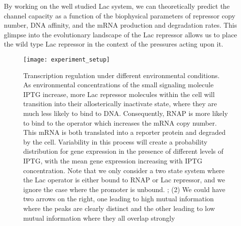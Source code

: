 By working on the well studied Lac system, we can theoretically predict the channel capacity as a function of the biophysical parameters of repressor copy number, DNA affinity, and the mRNA production and degradation rates. This glimpse into the evolutionary landscape of the Lac repressor allows us to place the wild type Lac repressor in the context of the pressures acting upon it.

\begin{figure}[h!]
	\centering \texttt{[image: experiment\_setup]} \caption{Transcription
		regulation under different environmental conditions. As environmental
		concentrations of the small signaling molecule IPTG increase, more Lac
		repressor molecules within the cell will transition into their allosterically
		inactivate state, where they are much less likely to bind to DNA. Consequently,
		RNAP is more likely to bind to the operator which increases the mRNA copy
		number. This mRNA is both translated into a reporter protein and degraded by
		the cell. Variability in this process will create a probability distribution
		for gene expression in the presence of different levels of IPTG, with the mean
		gene expression increasing with IPTG concentration. Note that we only consider
		a two state system where the Lac operator is either bound to RNAP or Lac
		repressor, and we ignore the case where the promoter is unbound. ; (2) We could have two arrows on the right, one leading to high mutual information where the peaks are clearly distinct and the other leading to low mutual information where they all overlap strongly}
	\label{figExpSetup}
\end{figure}

